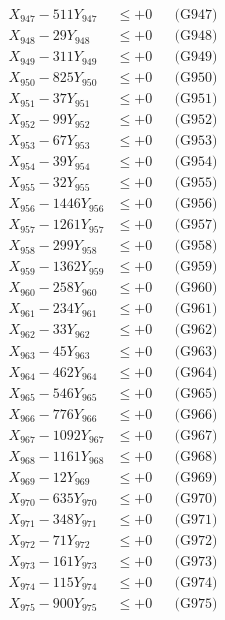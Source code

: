 \documentclass[a4paper,10pt]{article}
\begin{document}
{\begin{align}
X_{947} - 511Y_{947} &\leq +0 && \text{(G947)} \\
X_{948} - 29Y_{948} &\leq +0 && \text{(G948)} \\
X_{949} - 311Y_{949} &\leq +0 && \text{(G949)} \\
X_{950} - 825Y_{950} &\leq +0 && \text{(G950)} \\
\allowbreak
X_{951} - 37Y_{951} &\leq +0 && \text{(G951)} \\
X_{952} - 99Y_{952} &\leq +0 && \text{(G952)} \\
X_{953} - 67Y_{953} &\leq +0 && \text{(G953)} \\
X_{954} - 39Y_{954} &\leq +0 && \text{(G954)} \\
X_{955} - 32Y_{955} &\leq +0 && \text{(G955)} \\
X_{956} - 1446Y_{956} &\leq +0 && \text{(G956)} \\
X_{957} - 1261Y_{957} &\leq +0 && \text{(G957)} \\
X_{958} - 299Y_{958} &\leq +0 && \text{(G958)} \\
X_{959} - 1362Y_{959} &\leq +0 && \text{(G959)} \\
X_{960} - 258Y_{960} &\leq +0 && \text{(G960)} \\
\allowbreak
X_{961} - 234Y_{961} &\leq +0 && \text{(G961)} \\
X_{962} - 33Y_{962} &\leq +0 && \text{(G962)} \\
X_{963} - 45Y_{963} &\leq +0 && \text{(G963)} \\
X_{964} - 462Y_{964} &\leq +0 && \text{(G964)} \\
X_{965} - 546Y_{965} &\leq +0 && \text{(G965)} \\
X_{966} - 776Y_{966} &\leq +0 && \text{(G966)} \\
X_{967} - 1092Y_{967} &\leq +0 && \text{(G967)} \\
X_{968} - 1161Y_{968} &\leq +0 && \text{(G968)} \\
X_{969} - 12Y_{969} &\leq +0 && \text{(G969)} \\
X_{970} - 635Y_{970} &\leq +0 && \text{(G970)} \\
\allowbreak
X_{971} - 348Y_{971} &\leq +0 && \text{(G971)} \\
X_{972} - 71Y_{972} &\leq +0 && \text{(G972)} \\
X_{973} - 161Y_{973} &\leq +0 && \text{(G973)} \\
X_{974} - 115Y_{974} &\leq +0 && \text{(G974)} \\
X_{975} - 900Y_{975} &\leq +0 && \text{(G975)} \\

\end{align}}
\end{document}
